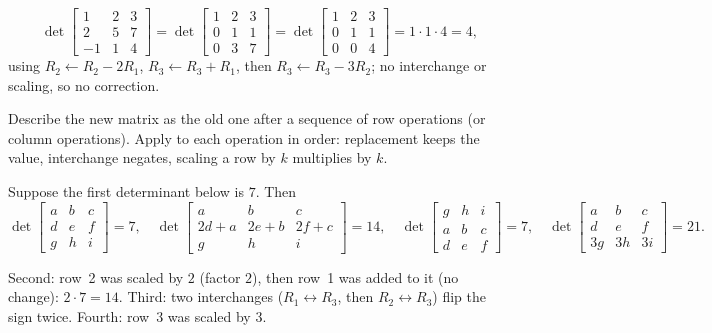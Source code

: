 \documentclass[10pt]{scrartcl}
\begin{document}
\begin{example*}
\[
  \det\begin{bmatrix}1&2&3\\2&5&7\\-1&1&4\end{bmatrix}
  =\det\begin{bmatrix}1&2&3\\0&1&1\\0&3&7\end{bmatrix}
  =\det\begin{bmatrix}1&2&3\\0&1&1\\0&0&4\end{bmatrix}=1\cdot1\cdot4=4,
\]
using $R_2\leftarrow R_2-2R_1$, $R_3\leftarrow R_3+R_1$, then $R_3\leftarrow R_3-3R_2$; no interchange or scaling, so no correction.
\end{example*}

\begin{steps}
  \ii Describe the new matrix as the old one after a sequence of row operations (or column operations).
  \ii Apply  to each operation in order: replacement keeps the value, interchange negates, scaling a row by $k$ multiplies by $k$.
\end{steps}

\begin{example*}
Suppose the first determinant below is $7$. Then
\[
  \det\begin{bmatrix}a&b&c\\d&e&f\\g&h&i\end{bmatrix}=7,\quad
  \det\begin{bmatrix}a&b&c\\2d+a&2e+b&2f+c\\g&h&i\end{bmatrix}=14,\quad
  \det\begin{bmatrix}g&h&i\\a&b&c\\d&e&f\end{bmatrix}=7,\quad
  \det\begin{bmatrix}a&b&c\\d&e&f\\3g&3h&3i\end{bmatrix}=21.
\]
\begin{itemize}
  \ii Second: row~2 was scaled by $2$ (factor $2$), then row~1 was added to it (no change): $2\cdot7=14$.
  \ii Third: two interchanges ($R_1\leftrightarrow R_3$, then $R_2\leftrightarrow R_3$) flip the sign twice.
  \ii Fourth: row~3 was scaled by $3$.
\end{itemize}
\end{example*}
\end{document}
